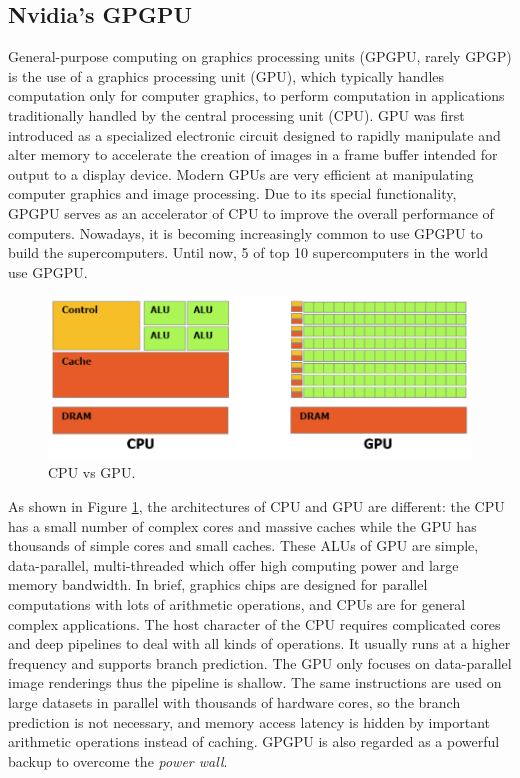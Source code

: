 \subsection{Nvidia's GPGPU}

General-purpose computing on graphics processing units (GPGPU, rarely GPGP) is the use of a graphics processing unit (GPU), which typically handles computation only for computer graphics, to perform computation in applications traditionally handled by the central processing unit (CPU). GPU was first introduced as a specialized electronic circuit designed to rapidly manipulate and alter memory to accelerate the creation of images in a frame buffer intended for output to a display device. Modern GPUs are very efficient at manipulating computer graphics and image processing. Due to its special functionality, GPGPU serves as an accelerator of CPU to improve the overall performance of computers. Nowadays, it is becoming increasingly common to use GPGPU to build the supercomputers. Until now, 5 of top 10 supercomputers in the world use GPGPU.

\begin{figure}[htbp]
	\centering
	\includegraphics[width=6.in]{fig/cpu_vs_gpu.png}
	\caption{CPU vs GPU.}
	\label{cpuvsgpu}
\end{figure}

As shown in Figure \ref{cpuvsgpu}, the architectures of CPU and GPU are different: the CPU has a small number of complex cores and massive caches while the GPU has thousands of simple cores and small caches. These ALUs of GPU are simple, data-parallel, multi-threaded which offer high computing power and large memory bandwidth. In brief, graphics chips are designed for parallel computations with lots of arithmetic operations, and CPUs are for general complex applications. The host character of the CPU requires complicated cores and deep pipelines to deal with all kinds of operations. It usually runs at a higher frequency and supports branch prediction. The GPU only focuses on data-parallel image renderings thus the pipeline is shallow. The same instructions are used on large datasets in parallel with thousands of hardware cores, so the branch prediction is not necessary, and memory access latency is hidden by important arithmetic operations instead of caching. GPGPU is also regarded as a powerful backup to overcome the \textit{power wall}.

